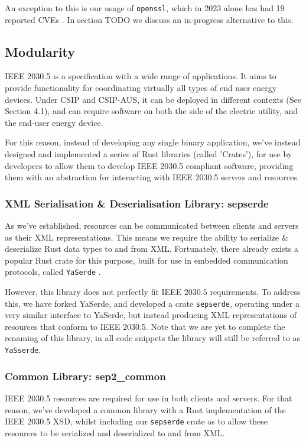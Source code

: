 An exception to this is our usage of \texttt{openssl}, which in 2023 alone has had 19 reported CVEs \cite{OpensslCVE}. In section TODO we discuss an in-progress alternative to this.

\subsection{Modularity}
IEEE 2030.5 is a specification with a wide range of applications. It aims to provide functionality for coordinating virtually all types of end user energy devices. Under CSIP and CSIP-AUS, it can be deployed in different contexts (See Section 4.1), and can require software on both the side of the electric utility, and the end-user energy device.

For this reason, instead of developing any single binary application, we've instead designed and implemented a series of Rust libraries (called 'Crates'), for use by developers to allow them to develop IEEE 2030.5 compliant software, providing them with an abstraction for interacting with IEEE 2030.5 servers and resources.

\subsubsection{XML Serialisation \& Deserialisation Library: \- sepserde}
As we've established, resources can be communicated between clients and servers as their XML representations. This means we require the ability to serialize \& deserialize Rust data types to and from XML.
Fortunately, there already exists a popular Rust crate for this purpose, built for use in embedded communication protocols, called \texttt{YaSerde} \cite[]{YaSerde}.

However, this library does not perfectly fit IEEE 2030.5 requirements. To address this, we have forked YaSerde, and developed a crate \texttt{sepserde}, operating under a very similar interface to YaSerde, but instead producing XML representations of resources that conform to IEEE 2030.5.
Note that we are yet to complete the renaming of this library, in all code snippets the library will still be referred to as \texttt{YaSserde}.

\subsubsection{Common Library: \- sep2\_common}
IEEE 2030.5 resources are required for use in both clients and servers. For that reason, we've developed a common library with a Rust implementation of the IEEE 2030.5 XSD, whilst including our \texttt{sepserde} crate as to allow these resources to be serialized and deserialized to and from XML.

